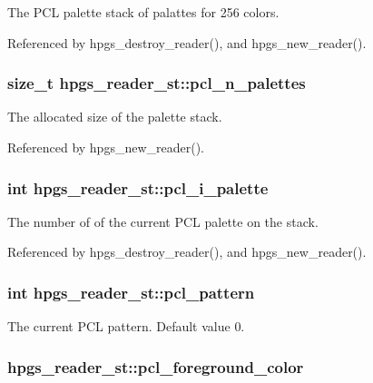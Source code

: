 The PCL palette stack of palattes for 256 colors. 

Referenced by hpgs\_\-destroy\_\-reader(), and hpgs\_\-new\_\-reader().
\subsubsection[pcl\_\-n\_\-palettes]{\setlength{\rightskip}{0pt plus 5cm}size\_\-t {\bf hpgs\_\-reader\_\-st::pcl\_\-n\_\-palettes}}\label{structhpgs__reader__st_0e0acf2acb5b1faaeb1fde401c03f562}


The allocated size of the palette stack. 

Referenced by hpgs\_\-new\_\-reader().
\subsubsection[pcl\_\-i\_\-palette]{\setlength{\rightskip}{0pt plus 5cm}int {\bf hpgs\_\-reader\_\-st::pcl\_\-i\_\-palette}}\label{structhpgs__reader__st_dc791ff7e8c2666ef0b41166f1ae0b74}


The number of of the current PCL palette on the stack. 

Referenced by hpgs\_\-destroy\_\-reader(), and hpgs\_\-new\_\-reader().
\subsubsection[pcl\_\-pattern]{\setlength{\rightskip}{0pt plus 5cm}int {\bf hpgs\_\-reader\_\-st::pcl\_\-pattern}}\label{structhpgs__reader__st_cf671880c6c1ae59c925349d9da5ba66}


The current PCL pattern. Default value 0. 
\subsubsection[pcl\_\-foreground\_\-color]{ {\bf hpgs\_\-reader\_\-st::pcl\_\-foreground\_\-color}}\label{structhpgs__reader__st_1a8109f23e2276a6cdc7b678c4a6462a}


